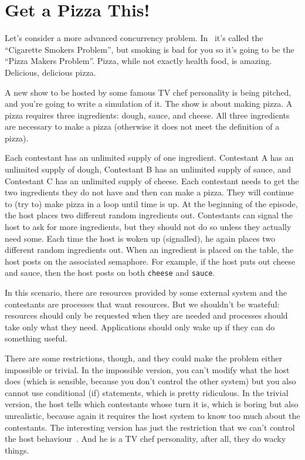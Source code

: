 




\section*{Get a Pizza This!}
Let's consider a more advanced concurrency problem. In~\cite{lbs} it's called the ``Cigarette Smokers Problem'', but smoking is bad for you so it's going to be the ``Pizza Makers Problem''. Pizza, while not exactly health food, is amazing. Delicious, delicious pizza.

A new show to be hosted by some famous TV chef personality is being pitched, and you're going to write a simulation of it. The show is about making pizza. A pizza requires three ingredients: dough, sauce, and cheese. All three ingredients are necessary to make a pizza (otherwise it does not meet the definition of a pizza).

Each contestant has an unlimited supply of one ingredient. Contestant A has an unlimited supply of dough, Contestant B has an unlimited supply of sauce, and Contestant C has an unlimited supply of cheese. Each contestant needs to get the two ingredients they do not have and then can make a pizza. They will continue to (try to) make pizza in a loop until time is up. At the beginning of the episode, the host places two different random ingredients out. Contestants can signal the host to ask for more ingredients, but they should not do so unless they actually need some. Each time the host is woken up (signalled), he again places two different random ingredients out. When an ingredient is placed on the table, the host posts on the associated semaphore. For example, if the host puts out cheese and sauce, then the host posts on both \texttt{cheese} and \texttt{sauce}.

In this scenario, there are resources provided by some external system and the contestants are processes that want resources. But we shouldn't be wasteful: resources should only be requested when they are needed and processes should take only what they need. Applications should only wake up if they can do something useful.

There are some restrictions, though, and they could make the problem either impossible or trivial. In the impossible version, you can't modify what the host does (which is sensible, because you don't control the other system) but you also cannot use conditional (if) statements, which is pretty ridiculous. In the trivial version, the host tells which contestants whose turn it is, which is boring but also unrealistic, because again it requires the host system to know too much about the contestants. The interesting version has just the restriction that we can't control the host behaviour~\cite{lbs}. And he is a TV chef personality, after all, they do wacky things.

